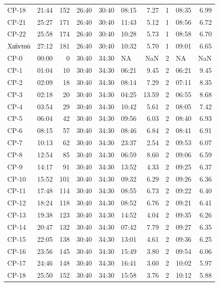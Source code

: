 \documentclass[]{elsarticle} %
\begin{document}
\begin{longtable}[t]{llrlllrllr}
CP-18 & 21:44 & 152 & 26:40 & 30:40 & 08:15 & 7.27 & 1 & 08:35 & 6.99\\
CP-21 & 25:27 & 171 & 26:40 & 30:40 & 11:43 & 5.12 & 1 & 08:56 & 6.72\\
\addlinespace
CP-22 & 25:58 & 174 & 26:40 & 30:40 & 10:28 & 5.73 & 1 & 08:58 & 6.70\\
Χαϊντού & 27:12 & 181 & 26:40 & 30:40 & 10:32 & 5.70 & 1 & 09:01 & 6.65\\
CP-0 & 00:00 & 0 & 30:40 & 34:30 & NA & NaN & 2 & NA & NaN\\
CP-1 & 01:04 & 10 & 30:40 & 34:30 & 06:21 & 9.45 & 2 & 06:21 & 9.45\\
CP-2 & 02:09 & 18 & 30:40 & 34:30 & 08:14 & 7.29 & 2 & 07:11 & 8.35\\
\addlinespace
CP-3 & 02:18 & 20 & 30:40 & 34:30 & 04:25 & 13.59 & 2 & 06:55 & 8.68\\
CP-4 & 03:54 & 29 & 30:40 & 34:30 & 10:42 & 5.61 & 2 & 08:05 & 7.42\\
CP-5 & 06:04 & 42 & 30:40 & 34:30 & 09:56 & 6.03 & 2 & 08:40 & 6.93\\
CP-6 & 08:15 & 57 & 30:40 & 34:30 & 08:46 & 6.84 & 2 & 08:41 & 6.91\\
CP-7 & 10:13 & 62 & 30:40 & 34:30 & 23:37 & 2.54 & 2 & 09:53 & 6.07\\
\addlinespace
CP-8 & 12:54 & 85 & 30:40 & 34:30 & 06:59 & 8.60 & 2 & 09:06 & 6.59\\
CP-9 & 14:17 & 91 & 30:40 & 34:30 & 13:52 & 4.33 & 2 & 09:25 & 6.37\\
CP-10 & 15:52 & 101 & 30:40 & 34:30 & 09:32 & 6.29 & 2 & 09:26 & 6.36\\
CP-11 & 17:48 & 114 & 30:40 & 34:30 & 08:55 & 6.73 & 2 & 09:22 & 6.40\\
CP-12 & 18:24 & 118 & 30:40 & 34:30 & 08:52 & 6.76 & 2 & 09:21 & 6.41\\
\addlinespace
CP-13 & 19:38 & 123 & 30:40 & 34:30 & 14:52 & 4.04 & 2 & 09:35 & 6.26\\
CP-14 & 20:47 & 132 & 30:40 & 34:30 & 07:42 & 7.79 & 2 & 09:27 & 6.35\\
CP-15 & 22:05 & 138 & 30:40 & 34:30 & 13:01 & 4.61 & 2 & 09:36 & 6.25\\
CP-16 & 23:56 & 145 & 30:40 & 34:30 & 15:49 & 3.80 & 2 & 09:54 & 6.06\\
CP-17 & 24:46 & 148 & 30:40 & 34:30 & 16:41 & 3.60 & 2 & 10:02 & 5.97\\
\addlinespace
CP-18 & 25:50 & 152 & 30:40 & 34:30 & 15:58 & 3.76 & 2 & 10:12 & 5.88\\

\end{longtable}
\end{document}

